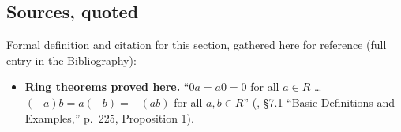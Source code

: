\subsection{Sources, quoted}\label{sec:09-ring-theorems:01-setup:2}

Formal definition and citation for this section, gathered here for reference (full entry in the \hyperref[sec:root:bibliography:1]{Bibliography}):

\begin{itemize}
\tightlist
\item
  \textbf{Ring theorems proved here.} ``\(0a = a0 = 0\) for all \(a \in R\) \ldots{} \((-a)b = a(-b) = -(ab)\) for all \(a, b \in R\)'' (\cite{DummitFoote2003}, §7.1 ``Basic Definitions and Examples,'' p.~225, Proposition 1).
\end{itemize}
